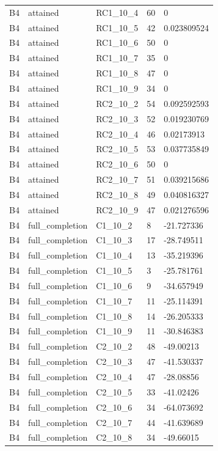 \begin{longtable}{lllll}
B4 & attained & RC1\_10\_4 & 60 & 0 \\
B4 & attained & RC1\_10\_5 & 42 & 0.023809524 \\
B4 & attained & RC1\_10\_6 & 50 & 0 \\
B4 & attained & RC1\_10\_7 & 35 & 0 \\
B4 & attained & RC1\_10\_8 & 47 & 0 \\
B4 & attained & RC1\_10\_9 & 34 & 0 \\
B4 & attained & RC2\_10\_2 & 54 & 0.092592593 \\
B4 & attained & RC2\_10\_3 & 52 & 0.019230769 \\
B4 & attained & RC2\_10\_4 & 46 & 0.02173913 \\
B4 & attained & RC2\_10\_5 & 53 & 0.037735849 \\
B4 & attained & RC2\_10\_6 & 50 & 0 \\
B4 & attained & RC2\_10\_7 & 51 & 0.039215686 \\
B4 & attained & RC2\_10\_8 & 49 & 0.040816327 \\
B4 & attained & RC2\_10\_9 & 47 & 0.021276596 \\
B4 & full\_completion & C1\_10\_2 & 8 & -21.727336 \\
B4 & full\_completion & C1\_10\_3 & 17 & -28.749511 \\
B4 & full\_completion & C1\_10\_4 & 13 & -35.219396 \\
B4 & full\_completion & C1\_10\_5 & 3 & -25.781761 \\
B4 & full\_completion & C1\_10\_6 & 9 & -34.657949 \\
B4 & full\_completion & C1\_10\_7 & 11 & -25.114391 \\
B4 & full\_completion & C1\_10\_8 & 14 & -26.205333 \\
B4 & full\_completion & C1\_10\_9 & 11 & -30.846383 \\
B4 & full\_completion & C2\_10\_2 & 48 & -49.00213 \\
B4 & full\_completion & C2\_10\_3 & 47 & -41.530337 \\
B4 & full\_completion & C2\_10\_4 & 47 & -28.08856 \\
B4 & full\_completion & C2\_10\_5 & 33 & -41.02426 \\
B4 & full\_completion & C2\_10\_6 & 34 & -64.073692 \\
B4 & full\_completion & C2\_10\_7 & 44 & -41.639689 \\
B4 & full\_completion & C2\_10\_8 & 34 & -49.66015 \\

\end{longtable}
